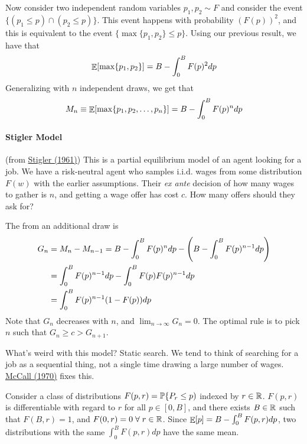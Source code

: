 \documentclass[10pt]{article}
\begin{document}
Now consider two independent random variables $p_1,p_2 \sim F$ and consider the event $\{(p_1 \le p) \cap (p_2 \le p)\}$. This event happens with probability $(F(p))^2$, and this is equivalent to the event $\{\max\{p_1,p_2\} \le p\}$. Using our previous result, we have that
\[
\mathop{\mathbb{E}}[\max\{p_1,p_2\}] = B - \int_0^B F(p)^2 dp
\]
Generalizing with $n$ independent draws, we get that
\[
M_n \equiv \mathop{\mathbb{E}}[\max\{p_1,p_2,\dots,p_n\}] = B - \int_0^B F(p)^n dp
\]


\paragraph{Stigler Model}

\begin{model}
	 (from \href{https://home.uchicago.edu/~vlima/courses/econ200/spring01/stigler.pdf}{Stigler (1961)}) This is a partial equilibrium model of an agent looking for a job. We have a risk-neutral agent who samples i.i.d. wages from some distribution $F(w)$ with the earlier assumptions. Their \emph{ex ante} decision of how many wages to gather is $n$, and getting a wage offer has cost $c$. How many offers should they ask for? 
	
	\begin{definition}
		The  from an additional draw is
		\begin{align*}
			G_n &= M_n - M_{n-1} = B - \int_0^B F(p)^n dp - \left( B - \int_0^B F(p)^{n-1}dp\right) \\
			&= \int_0^B F(p)^{n-1}dp - \int_0^B F(p)F(p)^{n-1}dp \\
			&= \int_0^B F(p)^{n-1}(1-F(p))dp
		\end{align*}
		Note that $G_n$ decreases with $n$, and $\lim_{n\to\infty}G_n = 0$. The optimal rule is to pick $n$ such that $G_n \ge c > G_{n+1}$. 
	\end{definition}
\end{model}
\begin{question}
		What's weird with this model? Static search. We tend to think of searching for a job as a sequential thing, not a single time drawing a large number of wages. \href{https://academic.oup.com/qje/article-abstract/84/1/113/1931495}{McCall (1970)} fixes this.
\end{question}

Consider a class of distributions $F(p,r) = \mathbb{P}\{P_r \le p)$ indexed by $r \in \mathbb{R}$. $F(p,r)$ is differentiable with regard to $r$ for all $p \in [0,B]$, and there exists $B \in \mathbb{R}$ such that $F(B,r) = 1$, and $F(0,r) = 0 \forall r \in \reals$. Since $\mathop{\mathbb{E}}[p] = B - \int_0^B F(p,r)dp$, two distributions with the same $\int_0^B F(p,r)dp$ have the same mean.
\end{document}
